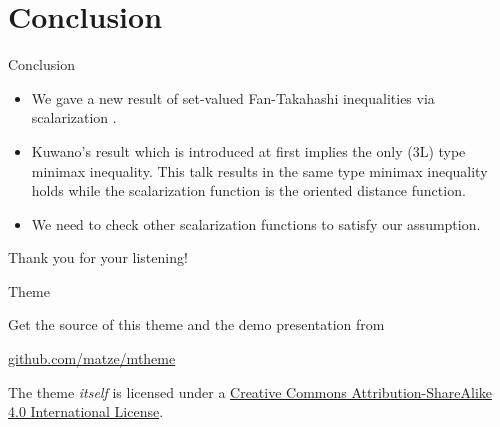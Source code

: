 \documentclass[aspectratio=169, dvipdfmx, 11pt]{beamer}
\begin{document}
\section{Conclusion}

\begin{frame}{Conclusion}
  \begin{itemize}
    \item We gave a new result of set-valued Fan-Takahashi inequalities via scalarization  .
    \item Kuwano's result which is introduced at first implies the only (3L) type minimax inequality.
          This talk results in the same type minimax inequality holds
          while the scalarization function is the oriented distance function.
    \item We need to check other scalarization functions to satisfy our assumption.
  \end{itemize}
\end{frame}

\printbibliography


\begin{frame}
  Thank you for your listening!
\end{frame}

\begin{frame}{Theme}

  Get the source of this theme and the demo presentation from

  \begin{center}\url{github.com/matze/mtheme}\end{center}

  The theme \emph{itself} is licensed under a
  \href{http://creativecommons.org/licenses/by-sa/4.0/}{Creative Commons
    Attribution-ShareAlike 4.0 International License}.

  \begin{center}\ccbysa\end{center}
\end{frame}
\end{document}
